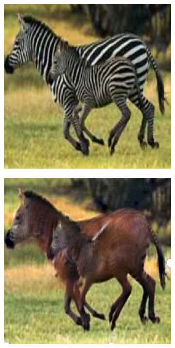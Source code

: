\begin{figure}
\begin{subfigure}[t]{.14\textwidth}
  \end{subfigure}
  \hfill
  \begin{subfigure}[t]{.14\textwidth}
    \centering
    \includegraphics[width=\linewidth]{images/cycleGanResults/zebra_input1.png}
  \end{subfigure}
  \begin{subfigure}[t]{.14\textwidth}
    \centering
    \includegraphics[width=\linewidth]{images/cycleGanResults/zebra_output1.png}
  \end{subfigure}


\end{figure}
